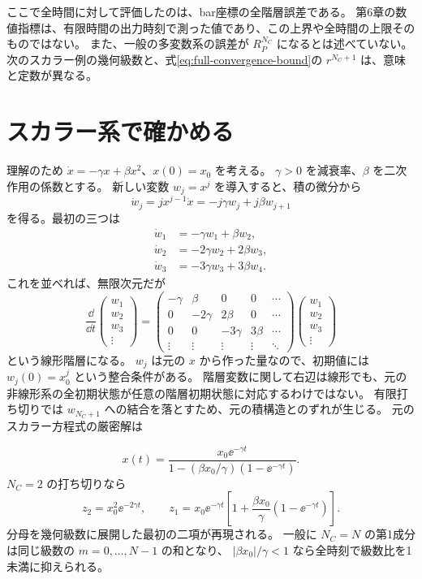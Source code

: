 \begin{notebox}
ここで全時間に対して評価したのは、bar座標の全階層誤差である。
第6章の数値指標は、有限時間の出力時刻で測った値であり、この上界や全時間の上限そのものではない。
また、一般の多変数系の誤差が $R_P^{N_C}$ になるとは述べていない。
次のスカラー例の幾何級数と、式\eqref{eq:full-convergence-bound}の $r^{N_C+1}$ は、意味と定数が異なる。
\end{notebox}

\section{スカラー系で確かめる}
理解のため $\dot x=-\gamma x+\beta x^2$、$x(0)=x_0$ を考える。
$\gamma>0$ を減衰率、$\beta$ を二次作用の係数とする。
新しい変数 $w_j=x^j$ を導入すると、積の微分から
\[
\dot w_j=jx^{j-1}\dot x=-j\gamma w_j+j\beta w_{j+1}
\]
を得る。最初の三つは
\begin{align*}
\dot w_1&=-\gamma w_1+\beta w_2,\\
\dot w_2&=-2\gamma w_2+2\beta w_3,\\
\dot w_3&=-3\gamma w_3+3\beta w_4.
\end{align*}
これを並べれば、無限次元だが
\[
\boxed{
\frac{\dd}{\dd t}\begin{pmatrix}w_1\\w_2\\w_3\\\vdots\end{pmatrix}
=\begin{pmatrix}
-\gamma&\beta&0&0&\cdots\\
0&-2\gamma&2\beta&0&\cdots\\
0&0&-3\gamma&3\beta&\cdots\\
\vdots&\vdots&\vdots&\vdots&\ddots
\end{pmatrix}
\begin{pmatrix}w_1\\w_2\\w_3\\\vdots\end{pmatrix}}
\]
という線形階層になる。
$w_j$ は元の $x$ から作った量なので、初期値には $w_j(0)=x_0^j$ という整合条件がある。
階層変数に関して右辺は線形でも、元の非線形系の全初期状態が任意の階層初期状態に対応するわけではない。
有限打ち切りでは $w_{N_C+1}$ への結合を落とすため、元の積構造とのずれが生じる。
元のスカラー方程式の厳密解は

\[
x(t)=\frac{x_0\ee^{-\gamma t}}
{1-(\beta x_0/\gamma)(1-\ee^{-\gamma t})}.
\]
$N_C=2$ の打ち切りなら
\[
z_2=x_0^2\ee^{-2\gamma t},\qquad
z_1=x_0\ee^{-\gamma t}
\left[1+\frac{\beta x_0}{\gamma}(1-\ee^{-\gamma t})\right].
\]
分母を幾何級数に展開した最初の二項が再現される。
一般に $N_C=N$ の第1成分は同じ級数の $m=0,\ldots,N-1$ の和となり、
$|\beta x_0|/\gamma<1$ なら全時刻で級数比を1未満に抑えられる。
